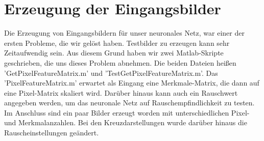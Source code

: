 \section{Erzeugung der Eingangsbilder}

Die Erzeugung von Eingangsbildern für unser neuronales Netz, war einer der ersten Probleme, die wir gelöst haben. Testbilder zu erzeugen kann sehr Zeitaufwendig sein. Aus diesem Grund haben wir zwei Matlab-Skripte geschrieben, die uns dieses Problem abnehmen. Die beiden Dateien heißen 'GetPixelFeatureMatrix.m' und 'TestGetPixelFeatureMatrix.m'. Das 'PixelFeatureMatrix.m' erwartet als Eingang eine Merkmale-Matrix, die dann auf eine Pixel-Matrix skaliert wird. Darüber hinaus kann auch ein Rauschwert angegeben werden, um das neuronale Netz auf Rauschempfindlichkeit zu testen. Im Anschluss sind ein paar Bilder erzeugt worden mit unterschiedlichen Pixel- und Merkmalanzahlen. Bei den Kreuzdarstellungen wurde darüber hinaus die Rauscheinstellungen geändert.

